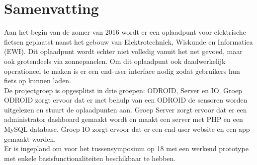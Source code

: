 \section{Samenvatting}
Aan het begin van de zomer van 2016 wordt er een oplaadpunt voor elektrische fietsen geplaatst naast het gebouw van Elektrotechniek, Wiskunde en Informatica (EWI). Dit oplaadpunt wordt echter niet volledig vanuit het net gevoed, maar ook grotendeels via zonnepanelen. Om dit oplaadpunt ook daadwerkelijk operationeel te maken is er een end-user interface nodig zodat gebruikers hun fiets op kunnen laden.\\
De projectgroep is opgesplitst in drie groepen: ODROID, Server en IO. Groep ODROID zorgt ervoor dat er met behulp van een ODROID de sensoren worden uitgelezen en stuurt de oplaadpunten aan. Groep Server zorgt ervoor dat er een administrator dashboard gemaakt wordt en maakt een server met PHP en een MySQL database. Groep IO zorgt ervoor dat er een end-user website en een app gemaakt worden.\\
Er is ingepland om voor het tussensymposium op 18 mei een werkend prototype met enkele basisfunctionaliteiten beschikbaar te hebben.